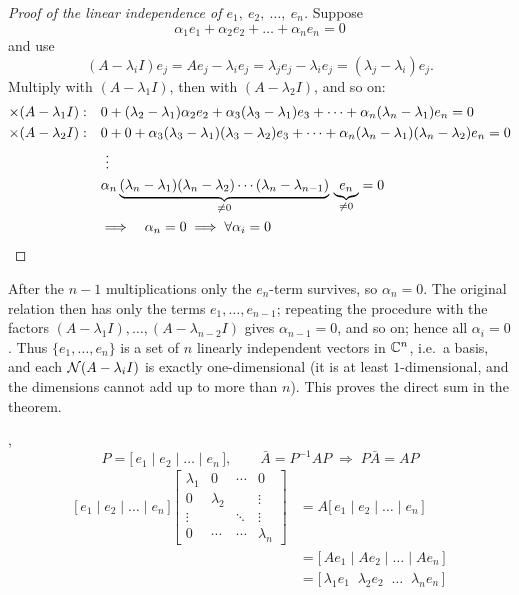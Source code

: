 \begin{proof}[Proof of the linear independence of $e_1,\ e_2,\ \dots,\ e_n$]
Suppose
\[ \alpha_1 e_1+\alpha_2 e_2+\dots+\alpha_n e_n = 0 \]
and use
\[ (A-\lambda_i I)e_j = Ae_j-\lambda_i e_j = \lambda_j e_j - \lambda_i e_j = (\lambda_j-\lambda_i)e_j . \]
Multiply with $(A-\lambda_1 I)$, then with $(A-\lambda_2 I)$, and so on:
\begin{align*}
\times(A-\lambda_1 I):&\quad 0 + (\lambda_2-\lambda_1)\alpha_2 e_2 + \alpha_3(\lambda_3-\lambda_1)e_3 + \dots + \alpha_n(\lambda_n-\lambda_1)e_n = 0\\
\times(A-\lambda_2 I):&\quad 0+0+\alpha_3(\lambda_3-\lambda_1)(\lambda_3-\lambda_2)e_3+\dots+\alpha_n(\lambda_n-\lambda_1)(\lambda_n-\lambda_2)e_n = 0\\
&\quad\ \vdots\\
&\quad \alpha_n\underbrace{(\lambda_n-\lambda_1)(\lambda_n-\lambda_2)\cdots(\lambda_n-\lambda_{n-1})}_{\neq 0}\,\underbrace{e_n}_{\neq 0} = 0\\
&\quad\Longrightarrow\quad \alpha_n = 0 \;\Longrightarrow\; \forall \alpha_i = 0\qedhere
\end{align*}
\end{proof}
\begin{insight}
After the $n-1$ multiplications only the $e_n$-term survives, so $\alpha_n=0$. The original relation then has only the terms $e_1,\dots,e_{n-1}$; repeating the procedure with the factors $(A-\lambda_1I),\dots,(A-\lambda_{n-2}I)$ gives $\alpha_{n-1}=0$, and so on; hence all $\alpha_i=0$. Thus $\{e_1,\dots,e_n\}$ is a set of $n$ linearly independent vectors in $\mathbb{C}^n$, i.e.\ a basis, and each $\mathcal{N}(A-\lambda_iI)$ is exactly one-dimensional (it is at least $1$-dimensional, and the dimensions cannot add up to more than $n$). This proves the direct sum in the theorem.
\end{insight}

\sep
\[
P=\big[\,e_1\mid e_2\mid\dots\mid e_n\,\big], \qquad \bar A = P^{-1}AP \;\Rightarrow\; P\bar A = AP
\]
\begin{align*}
\big[\,e_1\mid e_2\mid\dots\mid e_n\,\big]
\begin{bmatrix}\lambda_1 & 0 & \cdots & 0\\ 0 & \lambda_2 & & \vdots\\ \vdots & & \ddots & \vdots\\ 0 & \cdots & \cdots & \lambda_n\end{bmatrix}
&= A\big[\,e_1\mid e_2\mid\dots\mid e_n\,\big]\\
&= \big[\,Ae_1\mid Ae_2\mid\dots\mid Ae_n\,\big]\\
&= \big[\,\lambda_1 e_1 \;\; \lambda_2 e_2 \;\; \dots\;\; \lambda_n e_n\,\big]
\end{align*}

